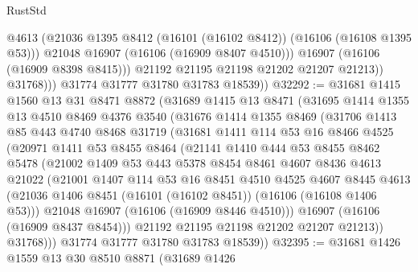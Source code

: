 \begin{lexlean}{RustStd}
\begin{coremodule}
                      @4613
                      (@21036 @1395 @8412 (@16101 (@16102 @8412)) (@16106 (@16108 @1395 @53)))
                      @21048
                      @16907
                      (@16106 (@16909 @8407 @4510)))
                    @16907
                    (@16106 (@16909 @8398 @8415)))
                  @21192
                  @21195
                  @21198
                  @21202
                  @21207
                  @21213))
              @31768)))
        @31774
        @31777
        @31780
        @31783
        @18539))
@32292 := @31681
    @1415
    @1560
    @13
    @31
    @8471
    @8872
    (@31689
      @1415
      @13
      @8471
      (@31695
        @1414
        @1355
        @13
        @4510
        @8469
        @4376
        @3540
        (@31676
          @1414
          @1355
          @8469
          (@31706
            @1413
            @85
            @443
            @4740
            @8468
            @31719
            (@31681
              @1411
              @114
              @53
              @16
              @8466
              @4525
              (@20971
                @1411
                @53
                @8455
                @8464
                (@21141
                  @1410
                  @444
                  @53
                  @8455
                  @8462
                  @5478
                  (@21002
                    @1409
                    @53
                    @443
                    @5378
                    @8454
                    @8461
                    @4607
                    @8436
                    @4613
                    @21022
                    (@21001
                      @1407
                      @114
                      @53
                      @16
                      @8451
                      @4510
                      @4525
                      @4607
                      @8445
                      @4613
                      (@21036 @1406 @8451 (@16101 (@16102 @8451)) (@16106 (@16108 @1406 @53)))
                      @21048
                      @16907
                      (@16106 (@16909 @8446 @4510)))
                    @16907
                    (@16106 (@16909 @8437 @8454)))
                  @21192
                  @21195
                  @21198
                  @21202
                  @21207
                  @21213))
              @31768)))
        @31774
        @31777
        @31780
        @31783
        @18539))
@32395 := @31681
    @1426
    @1559
    @13
    @30
    @8510
    @8871
    (@31689
      @1426

\end{coremodule}
\end{lexlean}

